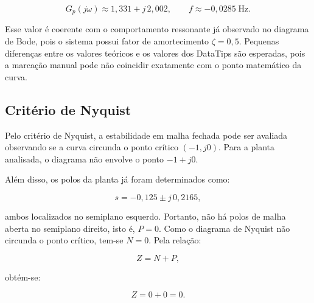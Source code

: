 \documentclass[12pt,a4paper]{article}
\begin{document}
\begin{equation}
  G_p(j\omega)\approx1{,}331+j\,2{,}002,
  \qquad f\approx-0{,}0285\;\text{Hz}.
\end{equation}

Esse valor é coerente com o comportamento ressonante já observado no diagrama de Bode, pois o sistema possui fator de amortecimento $\zeta=0{,}5$. Pequenas diferenças entre os valores teóricos e os valores dos DataTips são esperadas, pois a marcação manual pode não coincidir exatamente com o ponto matemático da curva.

\begin{table}[H]
  \centering
  \caption{Ponto principal destacado no diagrama de Nyquist.}
  \label{tab:q9_datatip}
\end{table}

\subsection{Critério de Nyquist}

Pelo critério de Nyquist, a estabilidade em malha fechada pode ser avaliada observando se a curva circunda o ponto crítico $(-1,j0)$. Para a planta analisada, o diagrama não envolve o ponto $-1+j0$.

Além disso, os polos da planta já foram determinados como:

\begin{equation}
  s=-0{,}125\pm j\,0{,}2165,
\end{equation}

ambos localizados no semiplano esquerdo. Portanto, não há polos de malha aberta no semiplano direito, isto é, $P=0$. Como o diagrama de Nyquist não circunda o ponto crítico, tem-se $N=0$. Pela relação:

\begin{equation}
  Z=N+P,
\end{equation}

obtém-se:

\begin{equation}
  Z=0+0=0.
\end{equation}
\end{document}
